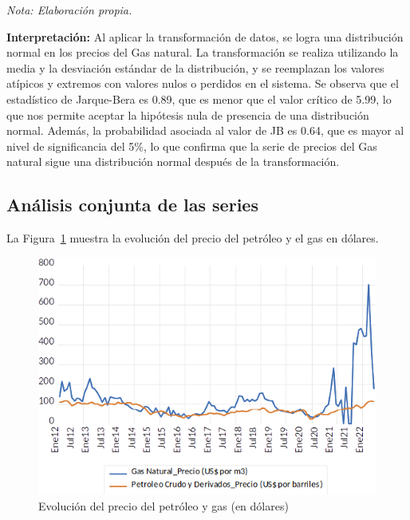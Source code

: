 \documentclass[
  a4paper,
]{article}
\begin{document}
\emph{Nota: Elaboración propia.}

\textbf{Interpretación:} Al aplicar la transformación de datos, se logra
una distribución normal en los precios del Gas natural. La
transformación se realiza utilizando la media y la desviación estándar
de la distribución, y se reemplazan los valores atípicos y extremos con
valores nulos o perdidos en el sistema. Se observa que el estadístico de
Jarque-Bera es 0.89, que es menor que el valor crítico de 5.99, lo que
nos permite aceptar la hipótesis nula de presencia de una distribución
normal. Además, la probabilidad asociada al valor de JB es 0.64, que es
mayor al nivel de significancia del 5\%, lo que confirma que la serie de
precios del Gas natural sigue una distribución normal después de la
transformación.

\hypertarget{anuxe1lisis-conjunta-de-las-series}{%
\subsection{Análisis conjunta de las
series}\label{anuxe1lisis-conjunta-de-las-series}}

La Figura~\ref{fig-9} muestra la evolución del precio del petróleo y el
gas en dólares.

\begin{figure}

\caption{\label{fig-9}Evolución del precio del petróleo y gas (en
dólares)}

{\centering \includegraphics{20230603091833.png}

}

\end{figure}
\end{document}
